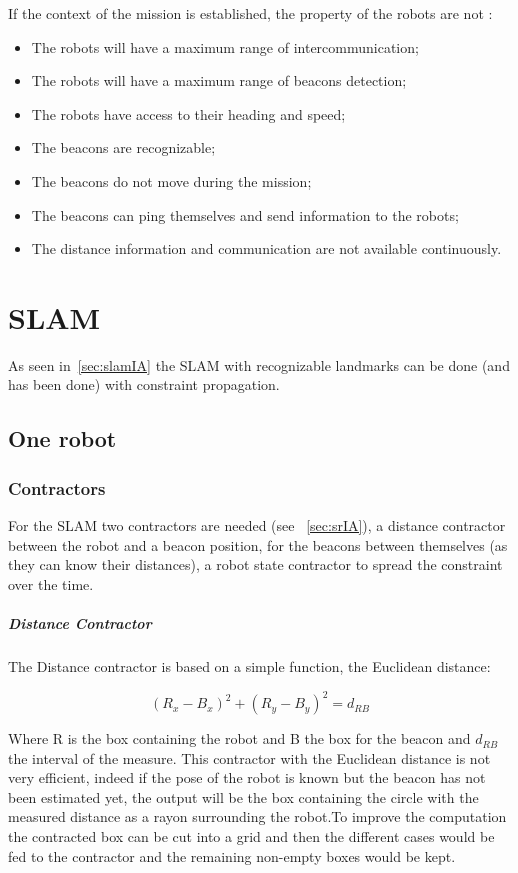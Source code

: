If the context of the mission is established, the property of the robots are not :
 
\begin{itemize}[label=$-$,itemsep=0cm,topsep=0cm]
\item The robots will have a maximum range of intercommunication;
\item The robots will have a maximum range of beacons detection;
\item The robots have access to their heading and speed;
\item The beacons are recognizable;
\item The beacons do not move during the mission;
\item The beacons can ping themselves and send information to the robots;
\item The distance information and communication are not available continuously.
\end{itemize}

\section{SLAM} \label{sec:slamtheory}

As seen in~\ref{sec:slamIA} the SLAM with recognizable landmarks can be done (and has been done) with constraint propagation.

\subsection{One robot}

\subsubsection*{Contractors}\label{sssec:contract}
For the SLAM two contractors are needed (see ~\ref{sec:srIA}), a distance contractor between the robot and a beacon position, for the beacons between themselves (as they can know their distances), a robot state contractor to spread the constraint over the time.

\subparagraph{Distance Contractor}
The Distance contractor is based on a simple function, the Euclidean distance:

\begin{equation}
(R_{x}-B_{x})^{2}+(R_{y}-B_{y})^{2} = d_{RB}
\end{equation}

Where R is the box containing the robot and B the box for the beacon and $d_{RB}$ the interval of the measure. This contractor with the Euclidean distance is not very efficient, indeed if the pose of the robot is known but the beacon has not been estimated yet, the output will be the box containing the circle with the measured distance as a rayon surrounding the robot.To improve the computation the contracted box can be cut into a grid and then the different cases would be fed to the contractor and the remaining non-empty boxes would be kept.


